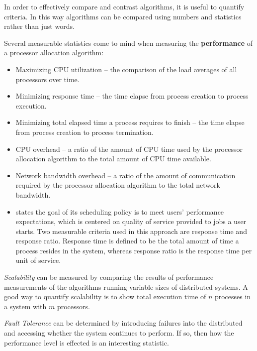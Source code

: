 \documentclass{report}
\begin{document}
In order to effectively compare and contrast algorithms, it is useful to
quantify criteria.  In this way algorithms can be compared using numbers and
statistics rather than just words.

Several measurable statistics come to mind when measuring the
\textbf{performance} of a processor allocation algorithm:

\begin{itemize}
	\item Maximizing CPU utilization -- the comparison of the load
	averages of all processors over time.

        \item Minimizing response time -- the time elapse from process
        creation to process execution.

        \item Minimizing total elapsed time a process requires to finish -- 
        the time elapse from process creation to process termination.

	\item CPU overhead -- a ratio of the amount of CPU time used by the
	processor allocation algorithm to the total amount of CPU time
	available.

	\item Network bandwidth overhead -- a ratio of the amount of
	communication required by the processor allocation algorithm to the
	total network bandwidth.

	\item \cite{preempt} states the goal of its scheduling policy is to
meet users' performance expectations, which is centered on quality of
service provided to jobs a user starts.  Two measurable criteria used in
this approach are response time and response ratio.  Response time is
defined to be the total amount of time a process resides in the system,
whereas response ratio is the response time per unit of service.

\end{itemize}

\emph{Scalability} can be measured by comparing the results of performance
measurements of the algorithms running variable sizes of distributed
systems.  A good way to quantify scalability is to show total execution time
of $n$ processes in a system with $m$ processors.

\emph{Fault Tolerance} can be determined by introducing failures into the
distributed and accessing whether the system continues to perform.  If so,
then how the performance level is effected is an interesting statistic.
\end{document}

